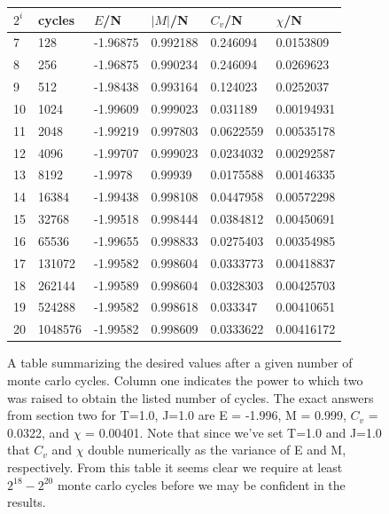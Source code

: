 \documentclass[11pt,a4paper]{article}
\begin{document}
\begin{figure}
\center
\begin{tabular}{| l | l | l | l | l | l |}
\hline
          
$2^i$     &       cycles      &          $E$/N      &    $|M|$/N   &    $C_v$/N      &     $\chi$/N	\\ \hline
7       &     128     &  	  -1.96875  &    0.992188   &   0.246094  &    0.0153809 \\ \hline
8       &     256     &     -1.96875  &   0.990234     & 0.246094    &  0.0269623 \\ \hline
 9      &      512     &      -1.98438   &   0.993164    & 0.124023    &  0.0252037\\ \hline
10     &      1024     &       -1.99609   &   0.999023    & 0.031189    & 0.00194931\\ \hline
11     &      2048     &  -1.99219   &   0.997803   &  0.0622559   &  0.00535178\\ \hline
 12     &      4096     &      -1.99707   &   0.999023   &  0.0234032   &  0.00292587\\ \hline
13    &       8192     &      -1.9978    &   0.99939    &  0.0175588   &  0.00146335\\ \hline
14    &      16384     &      -1.99438   &   0.998108   &  0.0447958   &  0.00572298\\ \hline
15    &      32768     &      -1.99518   &   0.998444   &  0.0384812   &  0.00450691\\ \hline
16   &       65536     &      -1.99655     &   0.998833   &   0.0275403  &   0.00354985\\ \hline
 17   &      131072     &         -1.99582   &   0.998604   & 0.0333773    & 0.00418837\\ \hline
 18   &      262144     &       -1.99589   &     0.998604 &    0.0328303 &    0.00425703\\ \hline
19   &      524288     &      -1.99582   &    0.998618  &     0.033347 &    0.00410651\\ \hline
20   &     1048576     &      -1.99582     & 0.998609    & 0.0333622     &0.00416172\\ \hline
\end{tabular}
\caption{A table summarizing the desired values after a given number of monte carlo cycles. Column one indicates the power to which two was raised to obtain the listed number of cycles. The exact answers from section two for T=1.0, J=1.0 are E = -1.996, M = 0.999, $C_v$ = 0.0322, and $\chi$ = 0.00401. Note that since we've set T=1.0 and J=1.0 that $C_v$ and $\chi$ double numerically as the variance of E and M, respectively. From this table it seems clear we require at least $2^{18}-2^{20}$ monte carlo cycles before we may be confident in the results.}
\end{figure}
\end{document}
